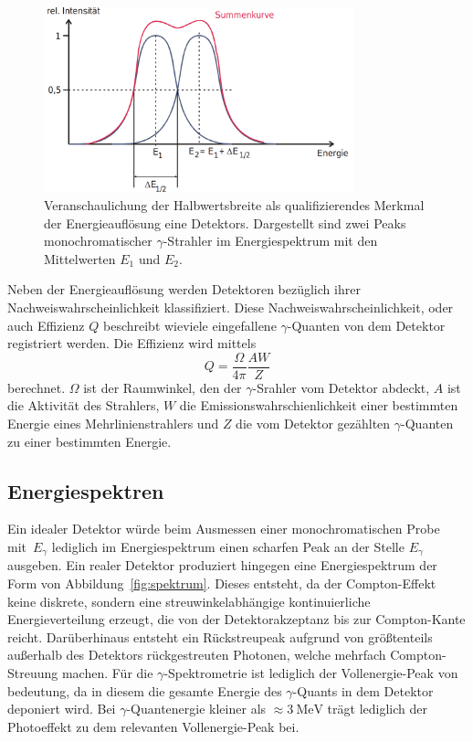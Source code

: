 \begin{figure}
  \centering
  \includegraphics[width=0.8\textwidth]{Pics/energieaufloesung.png}
  \caption{Veranschaulichung der Halbwertsbreite als qualifizierendes Merkmal der Energieauflösung eine Detektors.
  Dargestellt sind zwei Peaks monochromatischer $\gamma$-Strahler im Energiespektrum mit den
  Mittelwerten $E_1$ und $E_2$\cite{anleitung}.}
  \label{fig:energieauflösung}
\end{figure}

Neben der Energieauflösung werden Detektoren bezüglich ihrer Nachweiswahrscheinlichkeit
klassifiziert. Diese Nachweiswahrscheinlichkeit, oder auch Effizienz $Q$
beschreibt wieviele eingefallene $\gamma$-Quanten von dem Detektor
registriert werden.
Die Effizienz wird mittels
\begin{equation}
  \label{eqn:effizienz}
  Q = \frac{\Omega}{4\pi}\frac{AW}{Z}
\end{equation}
berechnet. $\Omega$ ist der Raumwinkel, den der $\gamma$-Srahler vom Detektor abdeckt,
$A$ ist die Aktivität des Strahlers, $W$ die Emissionswahrschienlichkeit einer bestimmten
Energie eines Mehrlinienstrahlers und $Z$ die vom Detektor gezählten $\gamma$-Quanten
zu einer bestimmten Energie.

\subsection{Energiespektren}
\label{subsec:energiespektrum}

Ein idealer Detektor würde beim Ausmessen einer monochromatischen Probe mit~$E_\gamma$
lediglich im Energiespektrum einen scharfen Peak an der Stelle $E_\gamma$
ausgeben. Ein realer Detektor produziert hingegen eine Energiespektrum der
Form von Abbildung~\ref{fig:spektrum}. Dieses entsteht, da der Compton-Effekt
keine diskrete, sondern eine streuwinkelabhängige kontinuierliche Energieverteilung
erzeugt, die von der Detektorakzeptanz bis zur Compton-Kante reicht.
Darüberhinaus entsteht ein Rückstreupeak aufgrund von größtenteils
außerhalb des Detektors rückgestreuten Photonen, welche mehrfach Compton-Streuung
machen.
Für die $\gamma$-Spektrometrie ist lediglich der Vollenergie-Peak
von bedeutung, da in diesem die gesamte Energie des $\gamma$-Quants
in dem Detektor deponiert wird. Bei $\gamma$-Quantenergie kleiner
als $\approx\SI{3}{\MeV}$ trägt lediglich der Photoeffekt zu dem relevanten
Vollenergie-Peak bei.

